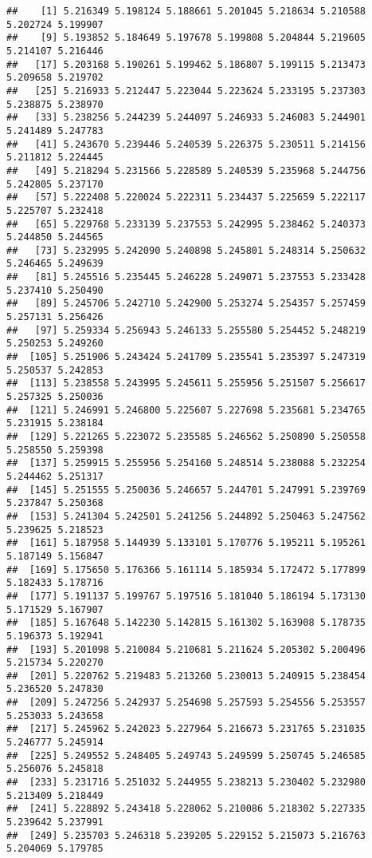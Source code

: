 \documentclass[
]{article}
\begin{document}
\begin{verbatim}
##    [1] 5.216349 5.198124 5.188661 5.201045 5.218634 5.210588 5.202724 5.199907
##    [9] 5.193852 5.184649 5.197678 5.199808 5.204844 5.219605 5.214107 5.216446
##   [17] 5.203168 5.190261 5.199462 5.186807 5.199115 5.213473 5.209658 5.219702
##   [25] 5.216933 5.212447 5.223044 5.223624 5.233195 5.237303 5.238875 5.238970
##   [33] 5.238256 5.244239 5.244097 5.246933 5.246083 5.244901 5.241489 5.247783
##   [41] 5.243670 5.239446 5.240539 5.226375 5.230511 5.214156 5.211812 5.224445
##   [49] 5.218294 5.231566 5.228589 5.240539 5.235968 5.244756 5.242805 5.237170
##   [57] 5.222408 5.220024 5.222311 5.234437 5.225659 5.222117 5.225707 5.232418
##   [65] 5.229768 5.233139 5.237553 5.242995 5.238462 5.240373 5.244850 5.244565
##   [73] 5.232995 5.242090 5.240898 5.245801 5.248314 5.250632 5.246465 5.249639
##   [81] 5.245516 5.235445 5.246228 5.249071 5.237553 5.233428 5.237410 5.250490
##   [89] 5.245706 5.242710 5.242900 5.253274 5.254357 5.257459 5.257131 5.256426
##   [97] 5.259334 5.256943 5.246133 5.255580 5.254452 5.248219 5.250253 5.249260
##  [105] 5.251906 5.243424 5.241709 5.235541 5.235397 5.247319 5.250537 5.242853
##  [113] 5.238558 5.243995 5.245611 5.255956 5.251507 5.256617 5.257325 5.250036
##  [121] 5.246991 5.246800 5.225607 5.227698 5.235681 5.234765 5.231915 5.238184
##  [129] 5.221265 5.223072 5.235585 5.246562 5.250890 5.250558 5.258550 5.259398
##  [137] 5.259915 5.255956 5.254160 5.248514 5.238088 5.232254 5.244462 5.251317
##  [145] 5.251555 5.250036 5.246657 5.244701 5.247991 5.239769 5.237847 5.250368
##  [153] 5.241304 5.242501 5.241256 5.244892 5.250463 5.247562 5.239625 5.218523
##  [161] 5.187958 5.144939 5.133101 5.170776 5.195211 5.195261 5.187149 5.156847
##  [169] 5.175650 5.176366 5.161114 5.185934 5.172472 5.177899 5.182433 5.178716
##  [177] 5.191137 5.199767 5.197516 5.181040 5.186194 5.173130 5.171529 5.167907
##  [185] 5.167648 5.142230 5.142815 5.161302 5.163908 5.178735 5.196373 5.192941
##  [193] 5.201098 5.210084 5.210681 5.211624 5.205302 5.200496 5.215734 5.220270
##  [201] 5.220762 5.219483 5.213260 5.230013 5.240915 5.238454 5.236520 5.247830
##  [209] 5.247256 5.242937 5.254698 5.257593 5.254556 5.253557 5.253033 5.243658
##  [217] 5.245962 5.242023 5.227964 5.216673 5.231765 5.231035 5.246777 5.245914
##  [225] 5.249552 5.248405 5.249743 5.249599 5.250745 5.246585 5.256076 5.245818
##  [233] 5.231716 5.251032 5.244955 5.238213 5.230402 5.232980 5.213409 5.218449
##  [241] 5.228892 5.243418 5.228062 5.210086 5.218302 5.227335 5.239642 5.237991
##  [249] 5.235703 5.246318 5.239205 5.229152 5.215073 5.216763 5.204069 5.179785

\end{verbatim}
\end{document}
